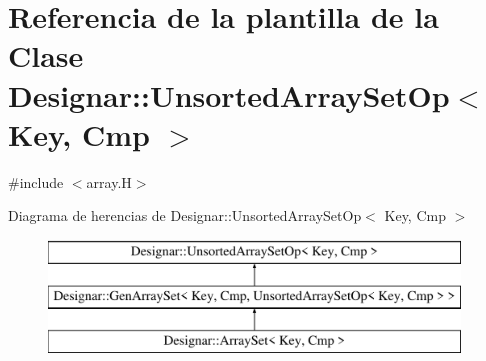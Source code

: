 \hypertarget{class_designar_1_1_unsorted_array_set_op}{}\section{Referencia de la plantilla de la Clase Designar\+:\+:Unsorted\+Array\+Set\+Op$<$ Key, Cmp $>$}
\label{class_designar_1_1_unsorted_array_set_op}


{\ttfamily \#include $<$array.\+H$>$}

Diagrama de herencias de Designar\+:\+:Unsorted\+Array\+Set\+Op$<$ Key, Cmp $>$\begin{figure}[H]
\begin{center}
\leavevmode
\includegraphics[height=3.000000cm]{class_designar_1_1_unsorted_array_set_op}
\end{center}
\end{figure}
